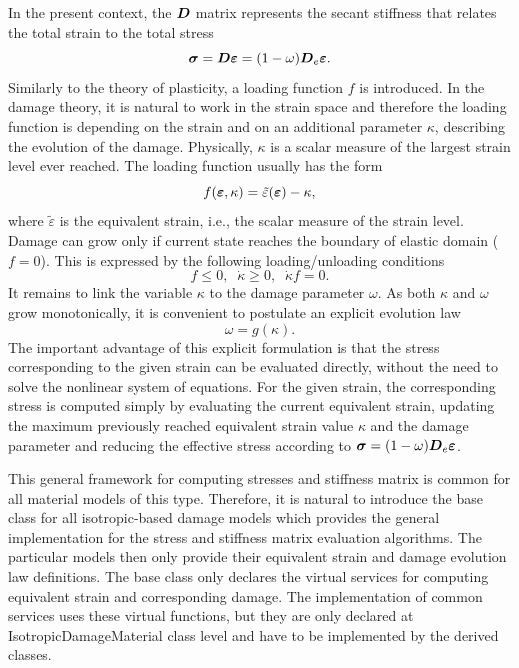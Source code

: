 \documentclass[a4paper]{article}
\newcommand{\mbf}[1]{\mbox{\boldmath$#1$}}
\begin{document}
 In the present context, the $\mbf{D}$ matrix represents the secant
 stiffness that relates the total strain to the total stress
 $$
 \mbf{\sigma}=\mbf{D}\mbf{\varepsilon} = (1-\omega)\mbf{D}_e\mbf{\varepsilon}.
 $$
 Similarly to the theory of plasticity, a loading function $f$ is
 introduced. In the damage theory, it is natural to work in the strain
 space and therefore the loading function is depending on the strain
 and on an additional parameter $\kappa$, describing the evolution of
 the damage. Physically, $\kappa$ is a scalar measure of the
 largest strain level ever reached. The loading function usually has
 the form
 $$
 f(\mbf{\varepsilon}, \kappa) = \tilde\varepsilon(\mbf{\varepsilon}) - \kappa,
 $$
 where $\tilde\varepsilon$ is the equivalent strain, i.e., the scalar
 measure of the strain level.
 Damage can grow only if current state reaches the boundary of elastic
 domain ($f=0$). This is expressed by the following loading/unloading
 conditions
 $$
 f \le 0,\;\;\dot\kappa \ge0,\;\;\dot\kappa f = 0.
 $$
 It remains to link the variable $\kappa$ to the damage parameter
 $\omega$. As both $\kappa$ and $\omega$ grow monotonically, it is
 convenient to postulate an explicit evolution law
 $$
 \omega = g(\kappa).
 $$
 The important advantage of this explicit formulation is that the
 stress corresponding to the given strain can be evaluated directly,
 without the need to solve the nonlinear system of equations.
 For the given strain, the corresponding stress is computed simply by
 evaluating the current equivalent strain, updating the maximum
 previously reached equivalent strain value $\kappa$  and the damage
 parameter and reducing the effective stress according to $\mbf{\sigma}
 = (1-\omega)\mbf{D}_e \mbf{\varepsilon}$.

 This general framework for computing stresses and
 stiffness matrix is  common for all material models of this type.
 Therefore, it is natural to introduce
 the base class for all isotropic-based damage models which provides the general
 implementation for the stress and stiffness matrix evaluation
 algorithms. The particular models then only provide their equivalent
 strain and damage evolution law definitions.
 The base class only declares the virtual services for computing equivalent
 strain and corresponding damage. The implementation of common services
 uses these virtual functions, but they are only declared at
 IsotropicDamageMaterial class level and have to be
 implemented by the derived classes.
\end{document}
